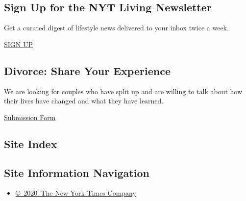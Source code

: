 \hypertarget{sign-up-for-the-nyt-living-newsletter}{%
\subsection{Sign Up for the NYT Living
Newsletter}\label{sign-up-for-the-nyt-living-newsletter}}

Get a curated digest of lifestyle news delivered to your inbox twice a
week.

\href{/newsletters/signup/LI}{SIGN UP}

\hypertarget{divorce-share-your-experience}{%
\subsection{Divorce: Share Your
Experience}\label{divorce-share-your-experience}}

We are looking for couples who have split up and are willing to talk
about how their lives have changed and what they have learned.

\href{http://www.nytimes3xbfgragh.onion/interactive/2014/style/boomer-divorce.html}{Submission
Form}

\hypertarget{site-index}{%
\subsection{Site Index}\label{site-index}}

\hypertarget{site-information-navigation}{%
\subsection{Site Information
Navigation}\label{site-information-navigation}}

\begin{itemize}
\tightlist
\item
  \href{https://help.nytimes3xbfgragh.onion/hc/en-us/articles/115014792127-Copyright-notice}{©~2020~The
  New York Times Company}
\end{itemize}


